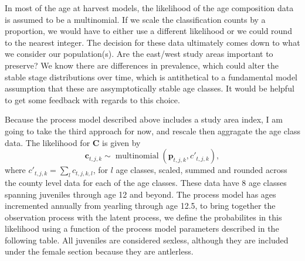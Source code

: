 \documentclass[12pt]{article}\usepackage[]{graphicx}\usepackage[]{color}
\DeclareMathOperator{\dmultinom}{multinomial}
\begin{document}
In most of the age at harvest models, the likelihood of the age composition data is assumed to be a multinomial. If we scale the classification counts by a proportion, we would have to either use a different likelihood or we could round to the nearest integer. The decision for these data ultimately comes down to what we consider our population(s). Are the east/west study areas important to preserve? We know there are differences in prevalence, which could alter the stable stage distributions over time, which is antithetical to a fundamental model assumption that these are assymptotically stable age classes. It would be helpful to get some feedback with regards to this choice. 

Because the process model described above includes a study area index, I am going to take the third approach for now, and rescale then aggragate the age class data. The likelihood for $\bm{C}$ is given by
\begin{equation}
\bm{c}_{t,j,k} \sim \dmultinom (\bm{p}_{t,j,k},c'_{t,j,k}),
\end{equation}
\noindent where $c'_{t,j,k} = \sum_l c_{t,j,k,l}$, for $l$ age classes, scaled, summed and rounded across the county level data for each of the age classes. These data have 8 age classes spanning juveniles through age 12 and beyond. The process model has ages incremented annually from yearling through age 12.5, to bring together the observation process with the latent process, we define the probabilites in this likelihood using a function of the process model parameters described in the following table. All juveniles are considered sexless, although they are included under the female section because they are antlerless. 
\end{document}
